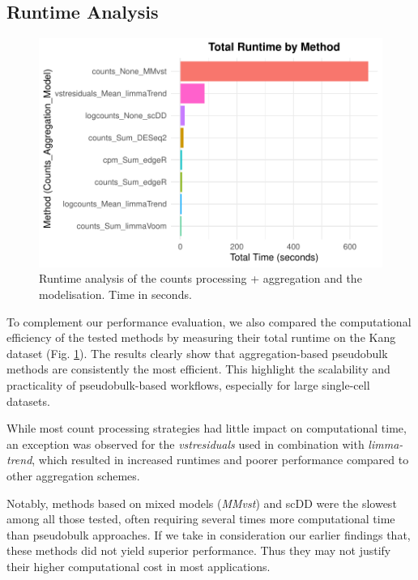 \documentclass[a4paper, 11pt, twocolumn]{article}
\begin{document}
\begin{multicols}{2}
	
\subsection{Runtime Analysis}

\begin{figure}[H]
	\centering
	\includegraphics[width=1\columnwidth]{figs/plot_runtime_Kang.pdf}
	\caption{{\footnotesize Runtime analysis of the counts processing + aggregation and the modelisation. Time in seconds.}}
	\label{fig:runtime}
\end{figure}

To complement our performance evaluation, we also compared the computational efficiency of the tested methods by measuring their total runtime on the Kang dataset (Fig. \ref{fig:runtime}). The results clearly show that aggregation-based pseudobulk methods are consistently the most efficient. This highlight the scalability and practicality of pseudobulk-based workflows, especially for large single-cell datasets.

While most count processing strategies had little impact on computational time, an exception was observed for the \textit{vstresiduals} used in combination with \textit{limma-trend}, which resulted in increased runtimes and poorer performance compared to other aggregation schemes. 

Notably, methods based on mixed models (\textit{MMvst}) and scDD were the slowest among all those tested, often requiring several times more computational time than pseudobulk approaches. If we take in consideration our earlier findings that, these methods did not yield superior performance. Thus they may not justify their higher computational cost in most applications.


\end{multicols}
\end{document}
